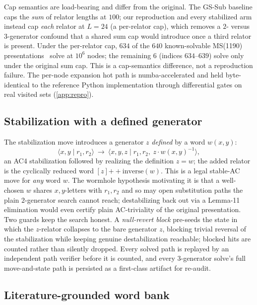 Cap semantics are load-bearing and differ from the original. The GS-Sub baseline caps the
\emph{sum} of relator lengths at $100$; our reproduction and every stabilized arm instead
cap \emph{each} relator at $L=24$ (a per-relator cap), which removes a $2$- versus
$3$-generator confound that a shared sum cap would introduce once a third relator is
present. Under the per-relator cap, $634$ of the $640$ known-solvable MS(1190)
presentations~\cite{miller1999ms} solve at $10^6$ nodes; the remaining $6$ (indices
$634$--$639$) solve only under the original sum cap. This is a cap-semantics difference, not
a reproduction failure. The per-node expansion hot path is numba-accelerated and held
byte-identical to the reference Python implementation through differential gates on real
visited sets (\ref{app:repro}).

\subsection{Stabilization with a defined generator}

The stabilization move introduces a generator $z$ \emph{defined} by a word $w(x,y)$:
\[
\langle x,y \mid r_1, r_2\rangle \ \longrightarrow\ \langle x,y,z \mid r_1, r_2,\
z\!\cdot\! w(x,y)^{-1}\rangle,
\]
an AC4 stabilization followed by realizing the definition $z=w$; the added relator is the
cyclically reduced word $[z] \mathbin{+\!\!+} \mathrm{inverse}(w)$. This is a legal
stable-AC move for \emph{any} word $w$. The wormhole hypothesis motivating it is that a
well-chosen $w$ shares $x,y$-letters with $r_1,r_2$ and so may open substitution paths the
plain $2$-generator search cannot reach; destabilizing back out via a Lemma-11 elimination
would even certify plain AC-triviality of the original presentation. Two guards keep the
search honest. A \emph{null-revert block} pre-seeds the state in which the $z$-relator
collapses to the bare generator $z$, blocking trivial reversal of the stabilization while
keeping genuine destabilization reachable; blocked hits are counted rather than silently
dropped. Every solved path is replayed by an independent path verifier before it is
counted, and every $3$-generator solve's full move-and-state path is persisted as a
first-class artifact for re-audit.

\subsection{Literature-grounded word bank}

